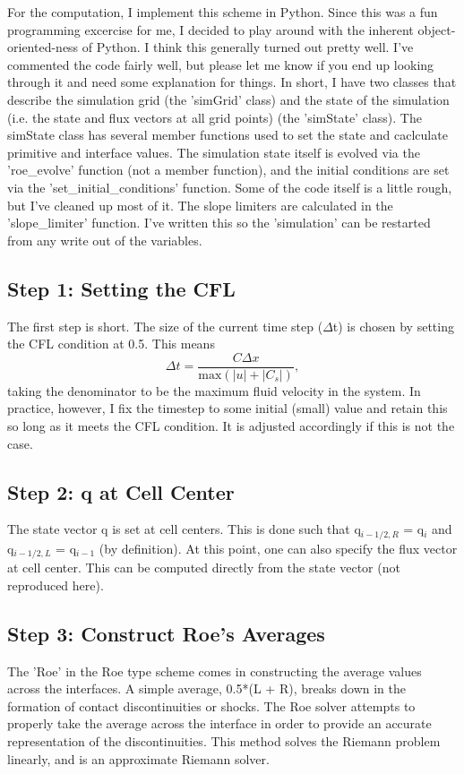 \documentclass{article}
\begin{document}
For the computation, I implement this scheme in Python. Since this was a fun
programming excercise for me, I decided to play around with the inherent 
object-oriented-ness of Python. I think this generally turned out pretty well.
I've commented the code fairly well, but please let me know if you end up looking
through it and need some explanation for things. In short, I have two classes
that describe the simulation grid (the 'simGrid' class) and the state of the 
simulation (i.e. the state and flux vectors at all grid points) 
(the 'simState' class). The simState class has several member functions used
to set the state and caclculate primitive and interface values. The simulation
state itself is evolved via the 'roe\_evolve' function (not a member function),
and the initial conditions are set via the 'set\_initial\_conditions' function.
Some of the code itself is a little rough, but I've cleaned up most of it. The
slope limiters are calculated in the 'slope\_limiter' function. I've written
this so the 'simulation' can be restarted from any write out of the variables.

\subsection{Step 1: Setting the CFL}
The first step is short. The size of the current time step ($\Delta$t) is chosen by 
setting the CFL condition at 0.5. This means
\begin{equation}
\label{eq:CFL}
\Delta t = \frac{C \Delta x}{\mathrm{max}(|u| + |C_{s}|)},
\end{equation}
taking the denominator to be the maximum fluid velocity in the system.
In practice, however, I fix the timestep to some initial (small) value and retain
this so long as it meets the CFL condition. It is adjusted accordingly if this
is not the case.

\subsection{Step 2: q at Cell Center}
The state vector q is set at cell centers. This is done such that q$_{i-1/2,R}$ = q$_{i}$
and q$_{i-1/2,L}$ = q$_{i-1}$ (by definition). At this point, one can also specify
the flux vector at cell center. This can be computed directly from the state
vector (not reproduced here).

\subsection{Step 3: Construct Roe's Averages}
The 'Roe' in the Roe type scheme comes in constructing the average values across the 
interfaces. A simple average, 0.5*(L + R), breaks down in the formation of 
contact discontinuities or shocks. The Roe solver attempts to properly take the 
average across the interface in order to provide an accurate representation of the
discontinuities. This method solves the Riemann problem linearly, and is an approximate
Riemann solver.
\end{document}
